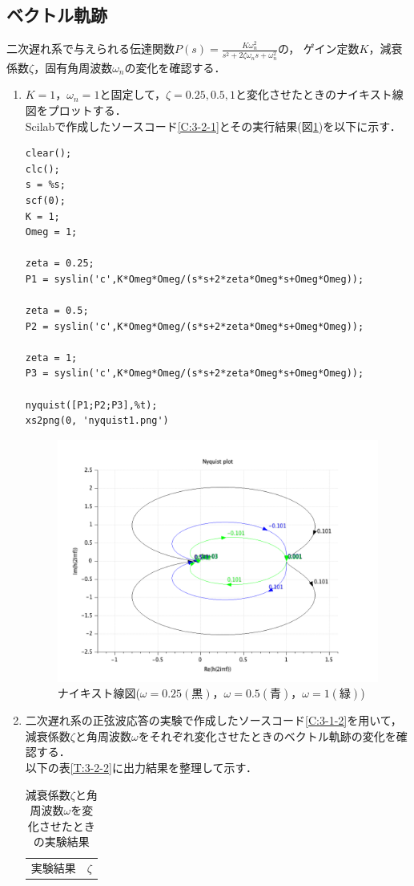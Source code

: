 \documentclass[a4paper,11pt]{jsarticle}
\begin{document}
  \subsection{ベクトル軌跡}
    二次遅れ系で与えられる伝達関数$P(s) = \frac{K\omega^2_n}{s^2+2\zeta\omega_ns+\omega^2_n}$の，
    ゲイン定数$K$，減衰係数$\zeta$，固有角周波数$\omega_n$の変化を確認する．
    \begin{enumerate}
      \item $K=1$，$\omega_n = 1$と固定して，$\zeta = 0.25, 0.5, 1$と変化させたときのナイキスト線図をプロットする．\\
      
      Scilabで作成したソースコード\ref{C:3-2-1}とその実行結果(図\ref{3-2-1})を以下に示す．
      \begin{lstlisting}[caption=二次遅れ系のナイキスト線図, label=C:3-2-1]
clear();
clc();
s = %s;
scf(0);
K = 1;
Omeg = 1;

zeta = 0.25;
P1 = syslin('c',K*Omeg*Omeg/(s*s+2*zeta*Omeg*s+Omeg*Omeg));

zeta = 0.5;
P2 = syslin('c',K*Omeg*Omeg/(s*s+2*zeta*Omeg*s+Omeg*Omeg));

zeta = 1;
P3 = syslin('c',K*Omeg*Omeg/(s*s+2*zeta*Omeg*s+Omeg*Omeg));

nyquist([P1;P2;P3],%t);
xs2png(0, 'nyquist1.png')
      \end{lstlisting}
      \begin{figure}[H]
        \centering
        \includegraphics[width=0.8\linewidth]{picture/3-2-1.png}
        \caption{ナイキスト線図($\omega=0.25(黒)$，$\omega = 0.5(青)$，$\omega = 1(緑)$)}
        \label{3-2-1}
      \end{figure}
    
    \item 二次遅れ系の正弦波応答の実験で作成したソースコード\ref{C:3-1-2}を用いて，
    減衰係数$\zeta$と角周波数$\omega$をそれぞれ変化させたときのベクトル軌跡の変化を確認する．\\
    以下の表\ref{T:3-2-2}に出力結果を整理して示す．
      \newpage
      \begin{table}[H]
          \centering
          \caption{減衰係数$\zeta$と角周波数$\omega$を変化させたときの実験結果}
          \begin{tabular}{|c|c|c|c|c|} \hline
            \multicolumn{2}{|c|}{\multirow{2}{*}{実験結果}} 
            & 
            \multicolumn{3}{|c|}{$\zeta$} 
            \\ \cline{3-5}


\end{tabular}
\end{table}
\end{enumerate}
\end{document}
